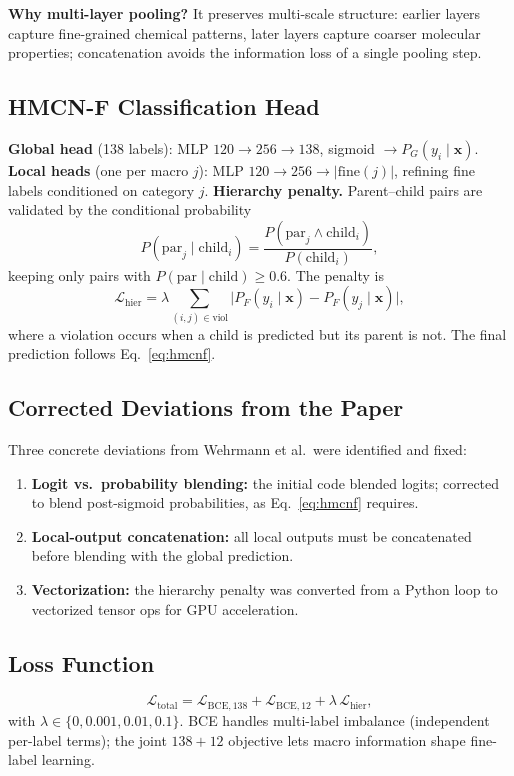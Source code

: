 \documentclass[10pt,twocolumn]{article}
\newcommand{\PF}{P_{F}}
\newcommand{\PG}{P_{G}}
\newcommand{\x}{\mathbf{x}}
\begin{document}
\noindent\textbf{Why multi-layer pooling?} It preserves multi-scale structure: earlier layers capture fine-grained chemical patterns, later layers capture coarser molecular properties; concatenation avoids the information loss of a single pooling step.

\subsection{HMCN-F Classification Head}
\textbf{Global head} (138 labels): MLP $120\!\rightarrow\!256\!\rightarrow\!138$, sigmoid $\rightarrow \PG(y_i\mid\x)$.
\textbf{Local heads} (one per macro $j$): MLP $120\!\rightarrow\!256\!\rightarrow\!|\text{fine}(j)|$, refining fine labels conditioned on category $j$.
\textbf{Hierarchy penalty.} Parent--child pairs are validated by the conditional probability
\begin{equation}
P(\text{par}_j\mid\text{child}_i)=\frac{P(\text{par}_j \wedge \text{child}_i)}{P(\text{child}_i)},
\end{equation}
keeping only pairs with $P(\text{par}\mid\text{child})\ge 0.6$. The penalty is
\begin{equation}
\mathcal{L}_{\mathrm{hier}}=\lambda\!\!\sum_{(i,j)\in\mathrm{viol}}\!\!\bigl|\PF(y_i\mid\x)-\PF(y_j\mid\x)\bigr|,
\end{equation}
where a violation occurs when a child is predicted but its parent is not. The final prediction follows Eq.~\eqref{eq:hmcnf}.

\subsection{Corrected Deviations from the Paper}
Three concrete deviations from Wehrmann et al.\ were identified and fixed:
\begin{enumerate}[leftmargin=1.4em,itemsep=2pt]
  \item \textbf{Logit vs.\ probability blending:} the initial code blended logits; corrected to blend post-sigmoid probabilities, as Eq.~\eqref{eq:hmcnf} requires.
  \item \textbf{Local-output concatenation:} all local outputs must be concatenated before blending with the global prediction.
  \item \textbf{Vectorization:} the hierarchy penalty was converted from a Python loop to vectorized tensor ops for GPU acceleration.
\end{enumerate}

\subsection{Loss Function}
\begin{equation}
\mathcal{L}_{\mathrm{total}}=\mathcal{L}_{\mathrm{BCE,138}}+\mathcal{L}_{\mathrm{BCE,12}}+\lambda\,\mathcal{L}_{\mathrm{hier}},
\end{equation}
with $\lambda\in\{0,0.001,0.01,0.1\}$. BCE handles multi-label imbalance (independent per-label terms); the joint $138+12$ objective lets macro information shape fine-label learning.
\end{document}

